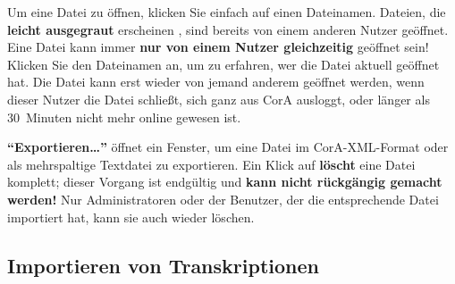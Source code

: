 \documentclass[11pt,a4paper,parskip=half]{scrartcl}
\begin{document}
Um eine Datei zu öffnen, klicken Sie einfach auf einen Dateinamen.  Dateien, die
\textbf{leicht ausgegraut} erscheinen , sind bereits von einem
anderen Nutzer geöffnet.  Eine Datei kann immer \textbf{nur von einem Nutzer
  gleichzeitig} geöffnet sein!  Klicken Sie den Dateinamen an, um zu erfahren,
wer die Datei aktuell geöffnet hat.  Die Datei kann erst wieder von jemand
anderem geöffnet werden, wenn dieser Nutzer die Datei schließt, sich ganz aus
CorA ausloggt, oder länger als 30~Minuten nicht mehr online gewesen ist.

\textbf{``Exportieren\ldots''}  öffnet ein Fenster, um eine Datei im
CorA-XML-Format oder als mehrspaltige Textdatei zu exportieren.  Ein Klick auf
 \textbf{löscht} eine Datei komplett; dieser Vorgang ist endgültig
und \textbf{kann nicht rückgängig gemacht werden!}  Nur Administratoren oder der
Benutzer, der die entsprechende Datei importiert hat, kann sie auch wieder
löschen.


\subsection{Importieren von Transkriptionen}
\label{sec:datei-import}
\end{document}

